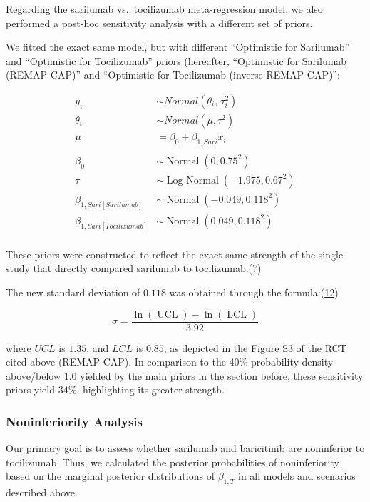 \documentclass[
  12pt,
]{article}
\begin{document}
Regarding the sarilumab vs.~tocilizumab meta-regression model, we also
performed a post-hoc sensitivity analysis with a different set of
priors.

We fitted the exact same model, but with different ``Optimistic for
Sarilumab'' and ``Optimistic for Tocilizumab'' priors (hereafter,
``Optimistic for Sarilumab (REMAP-CAP)'' and ``Optimistic for
Tocilizumab (inverse REMAP-CAP)'':

\begin{align*}
y_i & \sim Normal(\theta_i, \sigma_i^2) \tag{Likelihood}\\
\theta_i & \sim Normal(\mu, \tau^2)\\
\mu &= \beta_0 + \beta_{1, Sari} x_i\\
\\
\beta_0 & \sim \operatorname{Normal}(0, 0.75^2) \tag{Priors}\\
\tau & \sim \operatorname{Log-Normal}(-1.975, 0.67^2)\\
\beta_{1, Sari[Sarilumab]} & \sim \operatorname{Normal}(-0.049, 0.118^2)\\
\beta_{1, Sari[Tocilizumab]} & \sim \operatorname{Normal}(0.049, 0.118^2)\\
\end{align*}

These priors were constructed to reflect the exact same strength of the
single study that directly compared sarilumab to
tocilizumab.(\protect\hyperlink{ref-zotero-3144}{7})

The new standard deviation of \(0.118\) was obtained through the
formula:(\protect\hyperlink{ref-cochrane632}{12})

\[\sigma = \frac{\ln(\operatorname{UCL}) - \ln(\operatorname{LCL})}{3.92}\]

where \(UCL\) is \(1.35\), and \(LCL\) is \(0.85\), as depicted in the
Figure S3 of the RCT cited above (REMAP-CAP). In comparison to the 40\%
probability density above/below \(1.0\) yielded by the main priors in
the section before, these sensitivity priors yield \(34\%\),
highlighting its greater strength.

\newpage

\hypertarget{noninferiority-analysis}{%
\subsubsection{Noninferiority Analysis}\label{noninferiority-analysis}}

Our primary goal is to assess whether sarilumab and baricitinib are
noninferior to tocilizumab. Thus, we calculated the posterior
probabilities of noninferiority based on the marginal posterior
distributions of \(\beta_{1, T}\) in all models and scenarios described
above.
\end{document}
